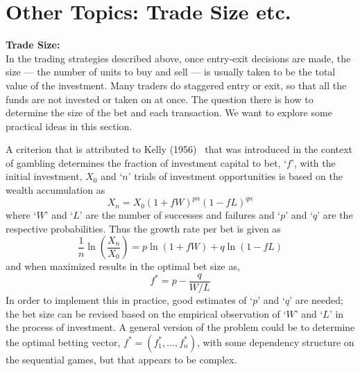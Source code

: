 \section{Other Topics: Trade Size etc.}

\noindent \textbf{Trade Size:} \\

In the trading strategies described above, once entry-exit decisions are made, the size --- the number of units to buy and sell --- is usually taken to be the total value of the investment. Many traders do staggered entry or exit, so that all the funds are not invested or taken on at once. The question there is how to determine the size of the bet and each transaction. We want to explore some practical ideas in this section. 


A criterion that is attributed to Kelly (1956)~\cite{kelly56} that was introduced in the context of gambling determines the fraction of investment capital to bet, `$f$', with the initial investment, $X_0$ and `$n$' trials of investment opportunities is based on the wealth accumulation as
	\begin{equation}\label{eqn:xmx01f}
	X_n= X_0(1+fW)^{pn} (1-fL)^{qn}
	\end{equation}
where `$W$' and `$L$' are the number of successes and failures and `$p$' and `$q$' are the respective probabilities. Thus the growth rate per bet is given as
	\begin{equation}\label{eqn:1nln}
	\dfrac{1}{n} \ln \left(\dfrac{X_n}{X_0}\right)= p \ln(1+fW) + q \ln(1-fL)
	\end{equation}
and when maximized results in the optimal bet size as,
	\begin{equation}\label{eqn:fstarp}
	f^*= p - \dfrac{q}{W/L}
	\end{equation}
In order to implement this in practice, good estimates of `$p$' and `$q$' are needed; the bet size can be revised based on the empirical observation of `$W$' and `$L$' in the process of investment. A general version of the problem could be to determine the optimal betting vector, $f^*=(f_1^*,\ldots,f_n^*)$, with some dependency structure on the sequential games, but that appears to be complex. 


